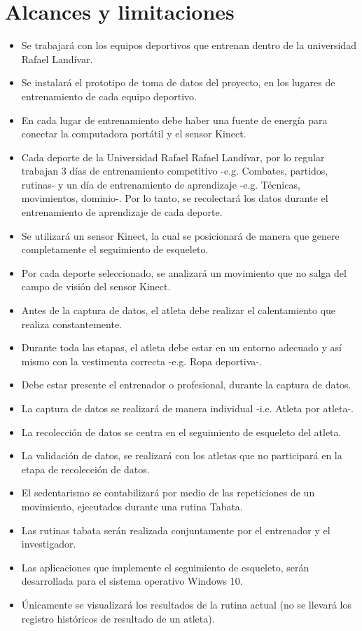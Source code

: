 \section{Alcances y limitaciones}
\begin{itemize}
\item Se trabajar\'a con los equipos deportivos que entrenan dentro de la universidad Rafael Land\'ivar.
\item Se instalar\'a el prototipo de toma de datos del proyecto, en los lugares de entrenamiento de cada equipo deportivo.
\item En cada lugar de entrenamiento debe haber una fuente de energ\'ia para conectar la computadora port\'atil y el sensor Kinect.
\item Cada deporte de la Universidad Rafael Rafael Land\'ivar, por lo regular  trabajan  3 d\'ias de entrenamiento competitivo -e.g. Combates, partidos, rutinas- y un d\'ia de entrenamiento de aprendizaje -e.g. T\'ecnicas, movimientos, dominio-. Por lo tanto, se recolectar\'a los datos durante el entrenamiento de aprendizaje de cada deporte.
\item Se utilizar\'a un sensor Kinect, la cual se posicionar\'a de manera que genere completamente el seguimiento de esqueleto.
\item Por cada deporte seleccionado, se analizar\'a un movimiento que no salga del campo de visi\'on del sensor Kinect.
\item Antes de la captura de datos, el atleta debe realizar el calentamiento que realiza constantemente.
\item Durante toda las etapas, el atleta debe estar en un entorno adecuado y as\'i mismo con la vestimenta correcta -e.g. Ropa deportiva-.
\item Debe estar presente el entrenador o profesional, durante la captura de datos.
\item  La captura de datos se realizar\'a de manera individual -i.e. Atleta por atleta-.
\item  La recolecci\'on de datos se centra en el seguimiento de esqueleto del atleta.
\item La validaci\'on de datos, se realizar\'a con los atletas que no participar\'a en la etapa de recolecci\'on de datos.
\item El sedentarismo se contabilizar\'a por medio de las repeticiones de un  movimiento, ejecutados durante una rutina Tabata.
\item Las rutinas tabata ser\'an realizada conjuntamente por el entrenador y el investigador.
\item Las aplicaciones que implemente el seguimiento de esqueleto, ser\'an desarrollada para el sistema operativo Windows 10.
\item \'Unicamente se visualizar\'a los resultados de la rutina actual (no se llevar\'a los registro hist\'oricos de resultado de un atleta).
\end{itemize}